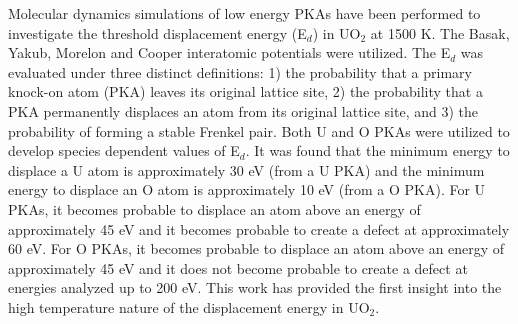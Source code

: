 \documentclass[review]{elsarticle}
\begin{document}
Molecular dynamics simulations of low energy PKAs have been performed to investigate the threshold displacement energy (E$_d$) in UO$_2$ at 1500 K. The Basak, Yakub, Morelon and Cooper interatomic potentials were utilized. The E$_d$ was evaluated under three distinct definitions: 1) the probability that a primary knock-on atom (PKA) leaves its original lattice site, 2) the probability that a PKA permanently displaces an atom from its original lattice site, and 3) the probability of forming a stable Frenkel pair. Both U and O PKAs were utilized to develop species dependent values of E$_d$. It was found that the minimum energy to displace a U atom is approximately 30 eV (from a U PKA) and the minimum energy to displace an O atom is approximately 10 eV (from a O PKA). For U PKAs, it becomes probable to displace an atom above an energy of approximately 45 eV and it becomes probable to create a defect at approximately 60 eV. For O PKAs, it becomes probable to displace an atom above an energy of approximately 45 eV and it does not become probable to create a defect at energies analyzed up to 200 eV. This work has provided the first insight into the high temperature nature of the displacement energy in UO$_2$.




\end{document}
